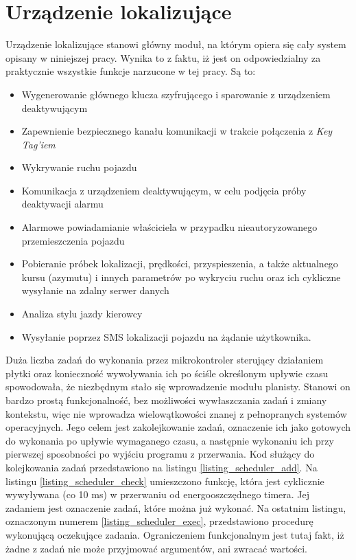 \section{Urządzenie lokalizujące}
\lstset{language=C}

Urządzenie lokalizujące stanowi główny moduł, na którym opiera się cały system opisany w niniejszej pracy. Wynika to z faktu, iż jest on odpowiedzialny za praktycznie wszystkie funkcje narzucone w tej pracy. Są to: 

\begin{itemize}
\item Wygenerowanie głównego klucza szyfrującego i sparowanie z urządzeniem deaktywującym
\item Zapewnienie bezpiecznego kanału komunikacji w trakcie połączenia z \textit{Key Tag'iem}
\item Wykrywanie ruchu pojazdu
\item Komunikacja z urządzeniem deaktywującym, w celu podjęcia próby deaktywacji alarmu
\item Alarmowe powiadamianie właściciela w przypadku nieautoryzowanego przemieszczenia pojazdu
\item Pobieranie próbek lokalizacji, prędkości, przyspieszenia, a  także aktualnego kursu (azymutu) i innych parametrów po wykryciu ruchu oraz ich cykliczne wysyłanie na zdalny serwer danych
\item Analiza stylu jazdy kierowcy
\item Wysyłanie poprzez SMS lokalizacji pojazdu na żądanie użytkownika.
\end{itemize}

\clearpage
Duża liczba zadań do wykonania przez mikrokontroler sterujący działaniem płytki oraz konieczność wywoływania ich po ściśle określonym upływie czasu spowodowała, że niezbędnym stało się wprowadzenie modułu planisty. Stanowi on bardzo prostą funkcjonalność, bez możliwości wywłaszczania zadań i zmiany kontekstu, więc nie wprowadza wielowątkowości znanej z pełnopranych systemów operacyjnych. Jego celem jest zakolejkowanie zadań, oznaczenie ich jako gotowych do wykonania po upływie wymaganego czasu, a następnie wykonaniu ich przy pierwszej sposobności po wyjściu programu z przerwania. Kod służący do  kolejkowania zadań przedstawiono na listingu \ref{listing_scheduler_add}. Na listingu \ref{listing_scheduler_check} umieszczono funkcję, która jest cyklicznie wywyływana (co 10 ms) w przerwaniu od energooszczędnego timera. Jej zadaniem jest oznaczenie zadań, które można już wykonać. Na ostatnim listingu, oznaczonym numerem  \ref{listing_scheduler_exec}, przedstawiono procedurę wykonującą oczekujące zadania. Ograniczeniem funkcjonalnym jest tutaj fakt, iż żadne z zadań nie może przyjmować argumentów, ani zwracać wartości. 
\clearpage

